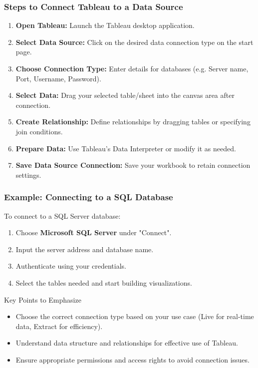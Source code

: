 \documentclass[aspectratio=169]{beamer}
\begin{document}
\begin{frame}[fragile]
    \frametitle{Steps to Connect Tableau to a Data Source}
    \begin{enumerate}
        \item \textbf{Open Tableau:} Launch the Tableau desktop application.
        \item \textbf{Select Data Source:} Click on the desired data connection type on the start page.
        \item \textbf{Choose Connection Type:} Enter details for databases (e.g. Server name, Port, Username, Password).
        \item \textbf{Select Data:} Drag your selected table/sheet into the canvas area after connection.
        \item \textbf{Create Relationship:} Define relationships by dragging tables or specifying join conditions.
        \item \textbf{Prepare Data:} Use Tableau's Data Interpreter or modify it as needed.
        \item \textbf{Save Data Source Connection:} Save your workbook to retain connection settings.
    \end{enumerate}
\end{frame}

\begin{frame}[fragile]
    \frametitle{Example: Connecting to a SQL Database}
    To connect to a SQL Server database:
    \begin{enumerate}
        \item Choose \textbf{Microsoft SQL Server} under "Connect".
        \item Input the server address and database name.
        \item Authenticate using your credentials. 
        \item Select the tables needed and start building visualizations.
    \end{enumerate}

    \begin{block}{Key Points to Emphasize}
        \begin{itemize}
            \item Choose the correct connection type based on your use case (Live for real-time data, Extract for efficiency).
            \item Understand data structure and relationships for effective use of Tableau.
            \item Ensure appropriate permissions and access rights to avoid connection issues.
        \end{itemize}
    \end{block}
\end{frame}
\end{document}
